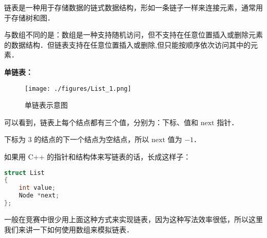
链表是一种用于存储数据的链式数据结构，形如一条链子一样来连接元素，通常用于存储树和图．

与数组不同的是：数组是一种支持随机访问，但不支持在任意位置插入或删除元素的数据结构．但链表支持在任意位置插入或删除,但只能按顺序依次访问其中的元素．

\textbf{单链表：}

\begin{figure}[ht]
\centering
\texttt{[image: ./figures/List\_1.png]}
\caption{单链表示意图} \label{List_fig1}
\end{figure}

可以看到，链表上每个结点都有三个值，分别为：下标、值和 $\text{next}$ 指针．

下标为 $3$ 的结点的下一个结点为空结点，所以 $\text{next}$ 值为 $-1$．

如果用 C++ 的指针和结构体来写链表的话，长成这样子：
\begin{lstlisting}[language=cpp]
struct List
{
    int value;
    Node *next;
};
\end{lstlisting}

一般在竞赛中很少用上面这种方式来实现链表，因为这种写法效率很低，所以这里我们来讲一下如何使用数组来模拟链表．